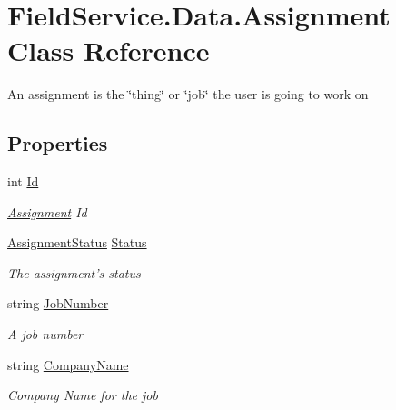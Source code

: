 \hypertarget{class_field_service_1_1_data_1_1_assignment}{\section{Field\+Service.\+Data.\+Assignment Class Reference}
\label{class_field_service_1_1_data_1_1_assignment}
}


An assignment is the \char`\"{}thing\char`\"{} or \char`\"{}job\char`\"{} the user is going to work on  


\subsection*{Properties}
\begin{DoxyCompactItemize}
\item 
int \hyperlink{class_field_service_1_1_data_1_1_assignment_a4282ea97277a5b6f8832398809b6ebbe}{Id}
\begin{DoxyCompactList}\small\item\em \hyperlink{class_field_service_1_1_data_1_1_assignment}{Assignment} Id \end{DoxyCompactList}\item 
\hyperlink{namespace_field_service_1_1_data_a87f0c66830f2bf43c90c245213fc3263}{Assignment\+Status} \hyperlink{class_field_service_1_1_data_1_1_assignment_a99aaf68d3cd77b538e8b2e45c0b7b14c}{Status}
\begin{DoxyCompactList}\small\item\em The assignment's status \end{DoxyCompactList}\item 
string \hyperlink{class_field_service_1_1_data_1_1_assignment_a61e064d5b34c2e76593ad0afac067527}{Job\+Number}
\begin{DoxyCompactList}\small\item\em A job number \end{DoxyCompactList}\item 
string \hyperlink{class_field_service_1_1_data_1_1_assignment_ad83cf9f23371713526a031bb300477e1}{Company\+Name}
\begin{DoxyCompactList}\small\item\em Company Name for the job \end{DoxyCompactList}\item 

\end{DoxyCompactItemize}
